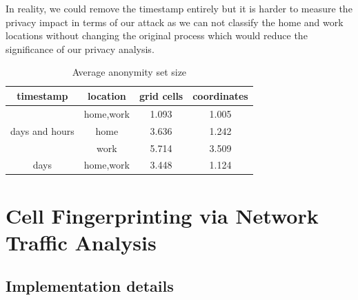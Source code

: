 \documentclass[10pt,conference,compsocconf]{IEEEtran}
\begin{document}
In reality, we could remove the timestamp entirely but it is harder to measure the privacy impact in terms of our attack as we can not classify the home and work locations without changing the original process which would reduce the significance of our privacy analysis.

\begin{table}[h!]
\centering
\begin{tabular}{ |c|c|c|c| } 
\hline
timestamp & location & grid cells & coordinates\\
\hline
\hline
\multirow{3}{4em}{days and hours} & home,work & 1.093 & 1.005 \\ 
& home & 3.636 & 1.242 \\ 
& work & 5.714 & 3.509 \\ 
\hline
days & home,work & 3.448 & 1.124 \\ 
\hline
\end{tabular}
\caption{\label{tab:anonset}Average anonymity set size}
\end{table}


\section{Cell Fingerprinting via Network Traffic Analysis}

\subsection{Implementation details}
\end{document}
